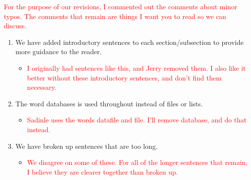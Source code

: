 \documentclass[letterpaper, parskip]{scrartcl}
\begin{document}
\textcolor{Red}{For the purpose of our revisions, I commented out the comments about minor typos. The comments that remain are things I want you to read so we can discuss.}

\begin{enumerate}
\item We have added introductory sentences to each section/subsection to provide more guidance to the reader. 
\begin{itemize}
	\item \textcolor{red}{I originally had sentences like this, and Jerry removed them. I also like it better without these introductory sentences, and don't find them necessary.}
\end{itemize}

\item The word databases is used throughout instead of files or lists. 
\begin{itemize}
	\item \textcolor{red}{Sadinle uses the words datafile and file. I'll remove database, and do that instead.}
\end{itemize}



\item We have broken up sentences that are too long.
\begin{itemize}
	\item \textcolor{red}{We disagree on some of these. For all of the longer sentences that remain, I believe they are clearer together than broken up.}
\end{itemize}


\end{enumerate}
\end{document}
